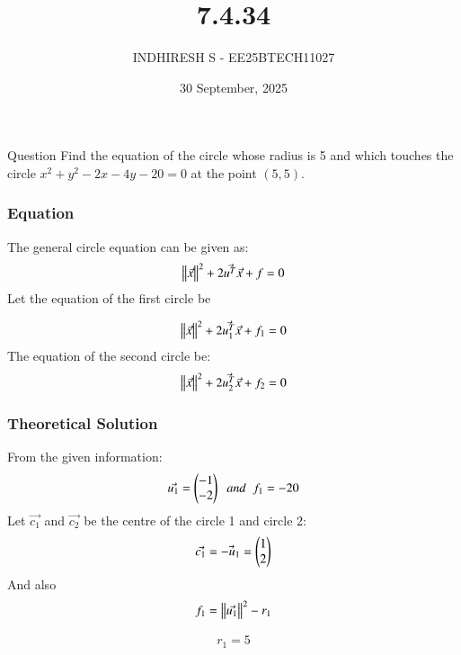 \documentclass{beamer}
\title %
    {7.4.34}
\date{30 September, 2025}
\author %
    {INDHIRESH S - EE25BTECH11027}
\begin{document}
    
    \frame{\titlepage}
    
    \begin{frame}{Question}
      Find the equation of the circle whose radius is 5 and which touches the circle $x^2 +y^2 - 2x - 4y - 20 = 0$ at the point $(5, 5)$.
    \end{frame}
    
    \begin{frame}[allowframebreaks] 
    \frametitle{Equation}
        \centering
        \label{tab:parameters}
   The general circle equation can be given as:
\begin{align}
  \left\lVert\Vec{x}\right\rVert^2+2\Vec{u^T}\Vec{x}+f=0
\end{align}
Let the equation of the first circle be

\begin{align}
  \left\lVert\Vec{x}\right\rVert^2+2\Vec{u_1^T}\Vec{x}+f_1=0
\end{align}
The equation of the second circle be:
\begin{align}
    \left\lVert\Vec{x}\right\rVert^2+2\Vec{u_2^T}\Vec{x}+f_2=0
\end{align}
    \end{frame}
    
    \begin{frame}
    \frametitle{Theoretical Solution}
From the given information:
\begin{align}
   \Vec{u_1}=\begin{pmatrix}-1\\-2\end{pmatrix}\;\;and\;\;f_1=-20
\end{align}
Let $\Vec{c_1}$ and $\Vec{c_2}$ be the centre of the circle 1 and circle 2:
\begin{align}
  \Vec{c_1}=\Vec{-u_1}=\begin{pmatrix}1\\2\end{pmatrix}
\end{align}
And also
\begin{align}
   f_1=\left\lVert\Vec{u_1}\right\rVert^2-r_1
\end{align}

\begin{align}
  r_1=5
\end{align}

    \end{frame}
    
\end{document}
